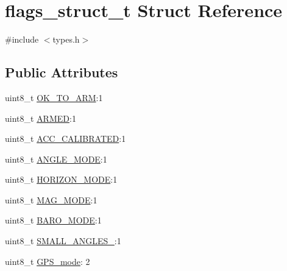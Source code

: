 \hypertarget{structflags__struct__t}{\section{flags\-\_\-struct\-\_\-t Struct Reference}
\label{structflags__struct__t}
}


{\ttfamily \#include $<$types.\-h$>$}

\subsection*{Public Attributes}
\begin{DoxyCompactItemize}
\item 
uint8\-\_\-t \hyperlink{structflags__struct__t_ab9097ddf6e1c1f3b12c17d903fe79437}{O\-K\-\_\-\-T\-O\-\_\-\-A\-R\-M}\-:1
\item 
uint8\-\_\-t \hyperlink{structflags__struct__t_ab012bd0f8430dadf5a9fdb124d752ace}{A\-R\-M\-E\-D}\-:1
\item 
uint8\-\_\-t \hyperlink{structflags__struct__t_af63430c14fd3b8cc45528fbce15bdaaa}{A\-C\-C\-\_\-\-C\-A\-L\-I\-B\-R\-A\-T\-E\-D}\-:1
\item 
uint8\-\_\-t \hyperlink{structflags__struct__t_a9dbf1f95e665583008f461414c353906}{A\-N\-G\-L\-E\-\_\-\-M\-O\-D\-E}\-:1
\item 
uint8\-\_\-t \hyperlink{structflags__struct__t_a4cb9cf704a153b21bab1a529ada99da3}{H\-O\-R\-I\-Z\-O\-N\-\_\-\-M\-O\-D\-E}\-:1
\item 
uint8\-\_\-t \hyperlink{structflags__struct__t_ae6f20ef363a74e51f6b092f48727660a}{M\-A\-G\-\_\-\-M\-O\-D\-E}\-:1
\item 
uint8\-\_\-t \hyperlink{structflags__struct__t_a8d457097d5a1d3fa9bf1f56ef48c6acc}{B\-A\-R\-O\-\_\-\-M\-O\-D\-E}\-:1
\item 
uint8\-\_\-t \hyperlink{structflags__struct__t_a897b15ddbc69e00652f3444f7f1f4217}{S\-M\-A\-L\-L\-\_\-\-A\-N\-G\-L\-E\-S\-\_}\-:1
\item 
uint8\-\_\-t \hyperlink{structflags__struct__t_a26b787cfd58cba6d8851d9f63d07a007}{G\-P\-S\-\_\-mode}\-: 2
\end{DoxyCompactItemize}


